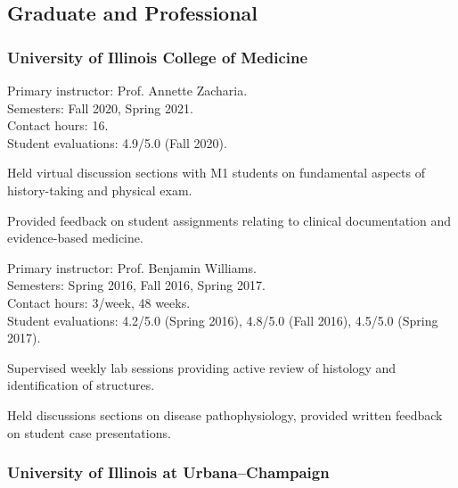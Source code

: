 \documentclass[%
]{komacv}
\begin{document}
\begin{longcv}

\subsection{Graduate and Professional}

\subsubsection{University of Illinois College of Medicine}

{Primary instructor: Prof. Annette Zacharia.\\
Semesters: Fall 2020, Spring 2021.\\
Contact hours: 16.\\
Student evaluations: 4.9/5.0 (Fall 2020).
\begin{compactitem}
\item Held virtual discussion sections with M1 students on fundamental aspects of history-taking and physical exam.
\item Provided feedback on student assignments relating to clinical documentation and evidence-based medicine.
\end{compactitem}}

{Primary instructor: Prof. Benjamin Williams.\\
Semesters: Spring 2016, Fall 2016, Spring 2017.\\
Contact hours: 3/week, 48 weeks.\\
Student evaluations: 4.2/5.0 (Spring 2016), 4.8/5.0 (Fall 2016), 4.5/5.0 (Spring 2017).
\begin{compactitem}
\item Supervised weekly lab sessions providing active review of histology and identification of structures.
\item Held discussions sections on disease pathophysiology, provided written feedback on student case presentations.
\end{compactitem}}

\subsubsection{University of Illinois at Urbana--Champaign}



\end{longcv}
\end{document}
